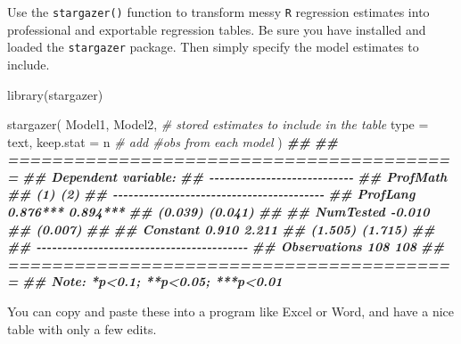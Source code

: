 \documentclass[
  12pt,
]{krantz}
\newenvironment{Shaded}{\begin{snugshade}}{\end{snugshade}}
\newcommand{\AttributeTok}[1]{\textcolor[rgb]{0.77,0.63,0.00}{#1}}
\newcommand{\CommentTok}[1]{\textcolor[rgb]{0.56,0.35,0.01}{\textit{#1}}}
\newcommand{\DocumentationTok}[1]{\textcolor[rgb]{0.56,0.35,0.01}{\textbf{\textit{#1}}}}
\newcommand{\FunctionTok}[1]{\textcolor[rgb]{0.00,0.00,0.00}{#1}}
\newcommand{\NormalTok}[1]{#1}
\newcommand{\StringTok}[1]{\textcolor[rgb]{0.31,0.60,0.02}{#1}}
\begin{document}
Use the \texttt{stargazer()} function to transform messy \texttt{R} regression estimates into professional and exportable regression tables. Be sure you have installed and loaded the \texttt{stargazer} package. Then simply specify the model estimates to include.

\begin{Shaded}
\begin{Highlighting}[]
  \FunctionTok{library}\NormalTok{(stargazer)}
  
  \FunctionTok{stargazer}\NormalTok{(}
\NormalTok{   Model1, Model2,    }\CommentTok{\# stored estimates to include in the table}
   \AttributeTok{type =} \StringTok{\textquotesingle{}text\textquotesingle{}}\NormalTok{,    }
   \AttributeTok{keep.stat =} \StringTok{\textquotesingle{}n\textquotesingle{}}   \CommentTok{\# add \#obs from each model}
\NormalTok{  ) }
\DocumentationTok{\#\# }
\DocumentationTok{\#\# =========================================}
\DocumentationTok{\#\#                  Dependent variable:     }
\DocumentationTok{\#\#              {-}{-}{-}{-}{-}{-}{-}{-}{-}{-}{-}{-}{-}{-}{-}{-}{-}{-}{-}{-}{-}{-}{-}{-}{-}{-}{-}{-}}
\DocumentationTok{\#\#                        ProfMath          }
\DocumentationTok{\#\#                   (1)            (2)     }
\DocumentationTok{\#\# {-}{-}{-}{-}{-}{-}{-}{-}{-}{-}{-}{-}{-}{-}{-}{-}{-}{-}{-}{-}{-}{-}{-}{-}{-}{-}{-}{-}{-}{-}{-}{-}{-}{-}{-}{-}{-}{-}{-}{-}{-}}
\DocumentationTok{\#\# ProfLang        0.876***      0.894***   }
\DocumentationTok{\#\#                 (0.039)        (0.041)   }
\DocumentationTok{\#\#                                          }
\DocumentationTok{\#\# NumTested                      {-}0.010    }
\DocumentationTok{\#\#                                (0.007)   }
\DocumentationTok{\#\#                                          }
\DocumentationTok{\#\# Constant         0.910          2.211    }
\DocumentationTok{\#\#                 (1.505)        (1.715)   }
\DocumentationTok{\#\#                                          }
\DocumentationTok{\#\# {-}{-}{-}{-}{-}{-}{-}{-}{-}{-}{-}{-}{-}{-}{-}{-}{-}{-}{-}{-}{-}{-}{-}{-}{-}{-}{-}{-}{-}{-}{-}{-}{-}{-}{-}{-}{-}{-}{-}{-}{-}}
\DocumentationTok{\#\# Observations      108            108     }
\DocumentationTok{\#\# =========================================}
\DocumentationTok{\#\# Note:         *p\textless{}0.1; **p\textless{}0.05; ***p\textless{}0.01}
\end{Highlighting}
\end{Shaded}

You can copy and paste these into a program like Excel or Word, and have a nice table with only a few edits.
\end{document}
